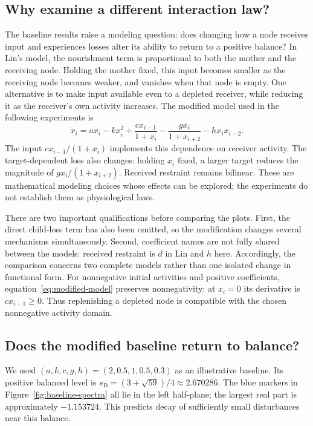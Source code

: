 \documentclass{article}
\begin{document}
\subsection{Why examine a different interaction law?}
The baseline results raise a modeling question: does changing how a node
receives input and experiences losses alter its ability to return to a
positive balance? In Lin's model, the nourishment term is proportional to
both the mother and the receiving node. Holding the mother fixed, this
input becomes smaller as the receiving node becomes weaker, and vanishes
when that node is empty. One alternative is to make input available even
to a depleted receiver, while reducing it as the receiver's own activity
increases. The modified model used in the following experiments is
\begin{equation}
 \dot x_i=a x_i-kx_i^2+\frac{c x_{i-1}}{1+x_i}
                  -\frac{g x_i}{1+x_{i+2}}-h x_i x_{i-2}.
 \label{eq:modified-model}
\end{equation}
The input $c x_{i-1}/(1+x_i)$ implements this dependence on receiver
activity. The target-dependent loss also changes: holding $x_i$ fixed,
a larger target reduces the magnitude of $g x_i/(1+x_{i+2})$.
Received restraint remains bilinear. These are mathematical modeling
choices whose effects can be explored; the experiments do not establish
them as physiological laws.

There are two important qualifications before comparing the plots.
First, the direct child-loss term has also been omitted, so the modification
changes several mechanisms simultaneously. Second, coefficient names are
not fully shared between the models: received restraint is $d$ in Lin and
$h$ here. Accordingly, the comparison concerns two complete models rather
than one isolated change in functional form. For nonnegative initial
activities and positive coefficients, equation~\eqref{eq:modified-model}
preserves nonnegativity: at $x_i=0$ its derivative is
$c x_{i-1}\geq0$. Thus replenishing a depleted node is compatible with the
chosen nonnegative activity domain.

\subsection{Does the modified baseline return to balance?}
We used $(a,k,c,g,h)=(2,0.5,1,0.5,0.3)$ as an illustrative baseline.
Its positive balanced level is
$s_{\mathrm D}=(3+\sqrt{59})/4\approx2.670286$.
The blue markers in Figure~\ref{fig:baseline-spectra} all lie in the left
half-plane; the largest real part is approximately $-1.153724$.
This predicts decay of sufficiently small disturbances near this balance.
\end{document}
